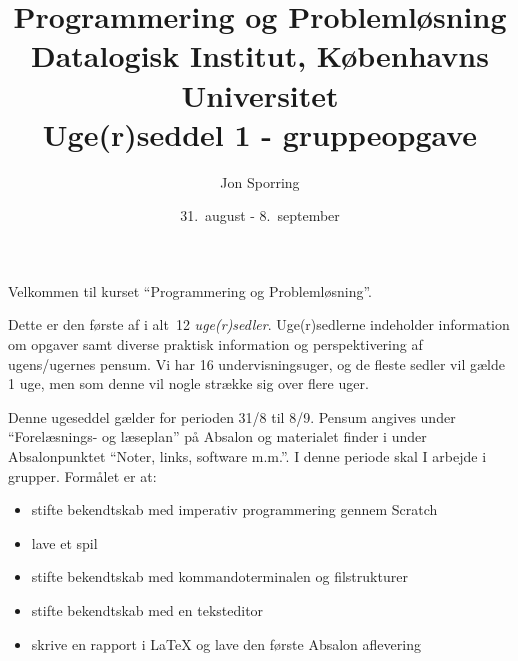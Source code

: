 \documentclass[a4paper,12pt]{article}
\title{Programmering og Problemløsning\\Datalogisk Institut,
  Københavns Universitet\\Uge(r)seddel 1 - gruppeopgave}
\author{Jon Sporring}
\date{31.\ august - 8.\ september}
\begin{document}
\maketitle

Velkommen til kurset ``Programmering og Problemløsning''.

Dette er den første af i alt~12 \emph{uge(r)sedler}. Uge(r)sedlerne indeholder information om opgaver samt diverse praktisk information og perspektivering af ugens/ugernes pensum. Vi har 16 undervisningsuger, og de fleste sedler vil gælde 1 uge, men som denne vil nogle strække sig over flere uger.

Denne ugeseddel gælder for perioden 31/8 til 8/9. Pensum angives under
"`Forelæsnings- og læseplan"' på Absalon og materialet finder i under
Absalonpunktet "`Noter, links, software m.m."'.  I denne periode skal
I arbejde i grupper. Formålet er at:
\begin{itemize}
\item stifte bekendtskab med imperativ programmering gennem Scratch
\item lave et spil
\item stifte bekendtskab med kommandoterminalen og filstrukturer
\item stifte bekendtskab med en teksteditor
\item skrive en rapport i LaTeX og lave den første Absalon aflevering
\end{itemize}
\end{document}
